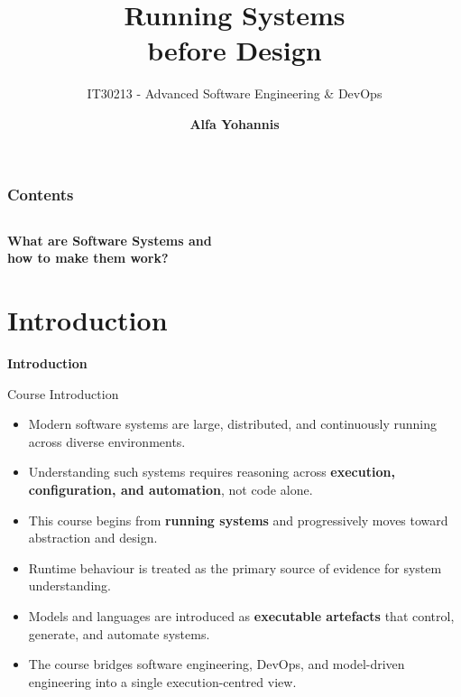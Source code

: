 \documentclass[aspectratio=169, table]{beamer}
\title{\Huge Running Systems \\
	\vspace{10pt}
	before Design}
\subtitle{IT30213 - Advanced Software Engineering \& DevOps}
\author{\textbf{Alfa Yohannis}}
\begin{document}
	
	\frame{\titlepage}
	

	\begin{frame}[fragile]
		\frametitle{Contents}
		\vspace{20pt}
		\begin{columns}[t]
			\tableofcontents[sections={1-4}]

			\tableofcontents[sections={5-20}]
		\end{columns}
	\end{frame}
	
	\begin{frame}{\hfill}
		\centering
		\Huge{\textbf{What are Software Systems and\\how to make them work?}}
	\end{frame}
	
	\section{Introduction}
	
	\begin{frame}{\hfill}
		\centering
		\Huge{\textbf{Introduction}}
	\end{frame}
	

\begin{frame}{Course Introduction}
	\vspace{20pt}
	\begin{itemize}
		\item Modern software systems are large, distributed, and continuously running across diverse environments.
		\item Understanding such systems requires reasoning across \textbf{execution, configuration, and automation}, not code alone.
		\item This course begins from \textbf{running systems} and progressively moves toward abstraction and design.
		\item Runtime behaviour is treated as the primary source of evidence for system understanding.
		\item Models and languages are introduced as \textbf{executable artefacts} that control, generate, and automate systems.
		\item The course bridges software engineering, DevOps, and model-driven engineering into a single execution-centred view.
	\end{itemize}
\end{frame}
\end{document}
